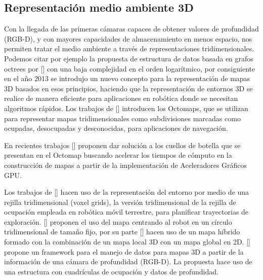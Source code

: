 \subsection{Representación medio ambiente 3D}


Con la llegada de las primeras c\'{a}maras capaces de obtener valores de profundidad (RGB-D), y con mayores capacidades de almacenamiento en menos espacio, nos permiten tratar el medio ambiente a través de representaciones tridimensionales. Podemos citar por ejemplo la propuesta de estructura de datos basada en grafos octrees por \citeauthor{DONALD1982}[] con una baja complejidad en el orden logarítmico, por consiguiente en el año 2013 se introdujo un nuevo concepto para la representaci\'{o}n de mapas 3D basados en esos principios, haciendo que la representaci\'{o}n de entornos 3D se realice de manera eficiente para aplicaciones en rob\'{o}tica donde se necesitan algoritmos r\'{a}pidos. Los trabajos de \citeauthor{ARMIN2013}[] introducen los Octomaps, que se utilizan para representar mapas tridimensionales como subdivisiones marcadas como ocupadas, desocupadas y desconocidas, para aplicaciones de navegaci\'{o}n.

En recientes trabajos \citeauthor{min2020accelerating}[] proponen dar soluci\'{o}n a los cuellos de botella que se presentan en el Octomap buscando acelerar los tiempos de cómputo en la construcci\'{o}n de mapas a partir de la implementaci\'{o}n de Aceleradores Gr\'{a}ficos GPU.

Los trabajos de \citeauthor{CIESLEWSKI2017}[] hacen uso de la representaci\'{o}n del entorno por medio de una rejilla tridimensional (voxel grids), la versión tridimensional de la rejilla de ocupación empleada en robótica móvil terrestre, para planificar trayectorias de exploraci\'{o}n. \citeauthor{USENKO2017}[] proponen el uso del mapa centrando al robot en un círculo tridimensional de tama\~{n}o fijo, por su parte \citeauthor{MOHTA2017}[] hacen uso de un mapa h\'{i}brido formado con la combinaci\'{o}n de un mapa local 3D con un mapa global en 2D. \citeauthor{FLORENCE2018}[] propone un framework para el manejo de datos para mapas 3D a partir de la información de una cámara de profundidad (RGB-D). La propuesta hace uso de una estructura con cuadrículas de ocupación y datos de profundidad.

